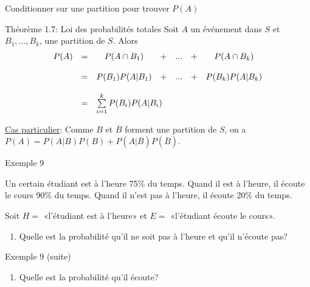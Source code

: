 \documentclass{BeamerTemplate}
\begin{document}
\begin{frame}[t]{Conditionner sur une partition pour trouver $P(A)$}
 \begin{Boite}{Théorème 1.7: Loi des probabilités totales}
  Soit $A$ un événement dans $S$ et $B_1,\ldots,B_k$, une partition
  de $S$. Alors
  $$\begin{array}{llccccc}
P(A)&=& P(A\cap B_1) &+&...&+&P(A\cap B_k)\\
&&&&&&\\
    &=&P(B_1)P(A|B_1)&+&...&+&P(B_k)P(A|B_k)\\
&&&&&&\\
    &=&\multicolumn{5}{l}{\sum\limits_{i=1}^k P(B_i)P(A|B_i)}\\
\end{array}
$$
 \end{Boite}


 \bigskip
 \underline{Cas particulier}: Comme $B$ et $\overline{B}$ forment une partition
 de $S$, on a $P(A)=P(A|B)P(B)+P(A|\overline{B})P(\overline{B})$.
\end{frame}
\begin{frame}[t]{Exemple 9}

{\small Un certain étudiant est à l'heure 75\% du temps. Quand il est à l'heure, il écoute le cours 90\% du temps. Quand il n'est pas à l'heure, il écoute 20\%
 du temps.

Soit $H=$ «l'étudiant est à l'heure» et $E=$ «l'étudiant écoute le cours».

\begin{enumerate}\itemsep 2cm
\item[a)] Quelle est la probabilité qu'il ne soit pas à l'heure et qu'il n'écoute pas?
\end{enumerate}



}
\end{frame}
\begin{frame}[t]{Exemple 9 (suite)}

{\small
\begin{enumerate}\itemsep 2cm
\item[b)]  Quelle est la probabilité qu'il écoute?
\end{enumerate}


 \vspace{5 cm}
}
\end{frame}
\end{document}
